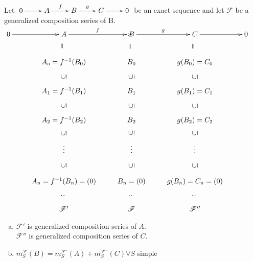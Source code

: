 Let $\xymatrix{0 \ar[r] & A\ar[r]^f & B\ar[r]^g & C \ar[r] & 0}$ be an exact sequence and let $\mathscr{F}$ be a generalized composition series of B.\\
$\xymatrix
{
	0\ar[r] & A\ar[r]^f & B\ar[r]^g\ar & C\ar[r] & 0\\
			& A_o=f^{-1}(B_0)\ar@{}[u]|-*[@]{=}	  & B_0	\ar@{}[u]|-*[@]{=}				& g(B_0)= C_0\ar@{}[u]|-*[@]{=} \\
			& A_1=f^{-1}(B_1)\ar@{}[u]|-*[@]{\subseteq} & B_1\ar@{}[u]|-*[@]{\subseteq}& g(B_1)= C_1\ar@{}[u]|-*[@]{\subseteq} \\
			& A_2=f^{-1}(B_2)\ar@{}[u]|-*[@]{\subseteq} & B_2\ar@{}[u]|-*[@]{\subseteq}& g(B_2)= C_2\ar@{}[u]|-*[@]{\subseteq} \\
			& \vdots\ar@{}[u]|-*[@]{\subseteq} & \vdots\ar@{}[u]|-*[@]{\subseteq}& \vdots\ar@{}[u]|-*[@]{\subseteq} \\
			& A_n=f^{-1}(B_n)=(0)\ar@{}[u]|-*[@]{\subseteq} & B_n=(0)\ar@{}[u]|-*[@]{\subseteq}& g(B_n)= C_n=(0)\ar@{}[u]|-*[@]{\subseteq} \\
			& \mathscr{F}'\ar@{}[u]|-*[@]{\colon} & \mathscr{F}\ar@{}[u]|-*[@]{\colon}& \mathscr{F}''\ar@{}[u]|-*[@]{\colon} \\
}$
\begin{prop}
	\begin{enumerate}[(a)]
		\item $\mathscr{F}'$ is generalized composition series of $A$.\\
		$\mathscr{F}''$ is generalized composition series of $C$.\\
		\item $m^{\mathscr{F}}_S(B)=m^{\mathscr{F}'}_S(A) + m^{\mathscr{F}''}_S(C) \forall S$ simple
	\end{enumerate}
\end{prop}